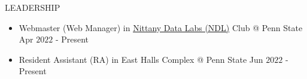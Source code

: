 \documentclass{resume} %
\begin{document}
\begin{rSection}{LEADERSHIP} 
\begin{itemize}
    \itemsep -3pt {}
    \item Webmaster (Web Manager) in \href{https://ndl.psu.edu/}{Nittany Data Labs (NDL)} Club @ Penn State \hfill Apr $2022$ - Present
    \item Resident Assistant (RA) in East Halls Complex @ Penn State \hfill Jun $2022$ - Present
\end{itemize}


\end{rSection}
\end{document}
